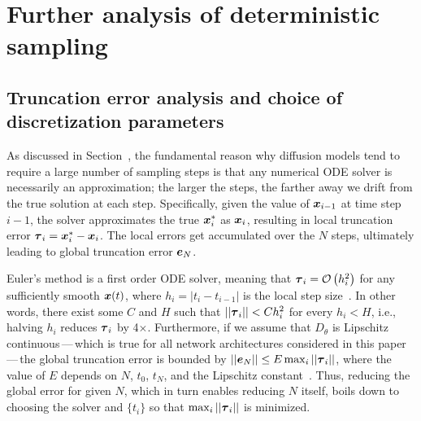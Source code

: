\section{Further analysis of deterministic sampling}
\label{app:deterministic}

\subsection{Truncation error analysis and choice of discretization parameters}
\label{app:truncationerror}

As discussed in Section~,
the fundamental reason why diffusion models tend to require a large number of sampling steps is that any numerical ODE solver is necessarily an approximation; the larger the steps, the farther away we drift from the true solution at each step.
Specifically, given the value of $\boldsymbol{x}_{i-1}$ at time step $i-1$, the solver approximates the true $\boldsymbol{x}^*_i$ as $\boldsymbol{x}_i$, resulting in local truncation error $\boldsymbol{\tau}_i = \boldsymbol{x}^*_i - \boldsymbol{x}_i$.
The local errors get accumulated over the $N$ steps, ultimately leading to global truncation error $\boldsymbol{e}_N$.

Euler's method is a first order ODE solver, meaning that $\boldsymbol{\tau}_i = \mathcal{O}\left(h_i^2\right)$ for any sufficiently smooth $\boldsymbol{x}(t)$, where $h_i = |t_i - t_{i-1}|$ is the local step size~\cite{Suli2003}.
In other words, there exist some $C$ and $H$ such that $||\boldsymbol{\tau}_i|| < C h_i^2$ for every $h_i < H$, i.e., halving $h_i$ reduces $\boldsymbol{\tau}_i$ by 4$\times$.
Furthermore, if we assume that $D_\theta$ is Lipschitz continuous\,---\,which is true for all network architectures considered in this paper\,---\,the global truncation error is bounded by $||\boldsymbol{e}_N|| \le E \max_i ||\boldsymbol{\tau}_i||$, where the value of $E$ depends on $N$, $t_0$, $t_N$, and the Lipschitz constant~\cite{Suli2003}.
Thus, reducing the global error for given $N$, which in turn enables reducing $N$ itself, boils down to choosing the solver and $\{t_i\}$ so that $\max_i ||\boldsymbol{\tau}_i||$ is minimized.

\figOdePlotExp

